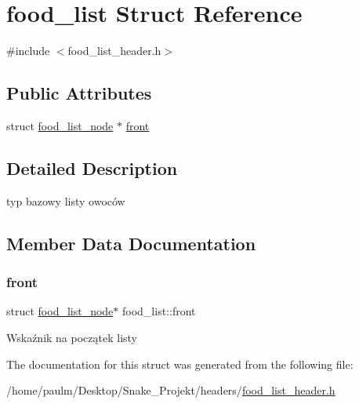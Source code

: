 \hypertarget{structfood__list}{}\section{food\+\_\+list Struct Reference}
\label{structfood__list}


{\ttfamily \#include $<$food\+\_\+list\+\_\+header.\+h$>$}

\subsection*{Public Attributes}
\begin{DoxyCompactItemize}
\item 
struct \mbox{\hyperlink{structfood__list__node}{food\+\_\+list\+\_\+node}} $\ast$ \mbox{\hyperlink{structfood__list_a8cefe9f4d664bbca8bb05e8a7866ac0f}{front}}
\end{DoxyCompactItemize}


\subsection{Detailed Description}
typ bazowy listy owoców 

\subsection{Member Data Documentation}
\mbox{\label{structfood__list_a8cefe9f4d664bbca8bb05e8a7866ac0f}} 
\subsubsection{\texorpdfstring{front}{front}}
{\footnotesize\ttfamily struct \mbox{\hyperlink{structfood__list__node}{food\+\_\+list\+\_\+node}}$\ast$ food\+\_\+list\+::front}

Wskaźnik na początek listy 

The documentation for this struct was generated from the following file\+:\begin{DoxyCompactItemize}
\item 
/home/paulm/\+Desktop/\+Snake\+\_\+\+Projekt/headers/\mbox{\hyperlink{food__list__header_8h}{food\+\_\+list\+\_\+header.\+h}}\end{DoxyCompactItemize}
